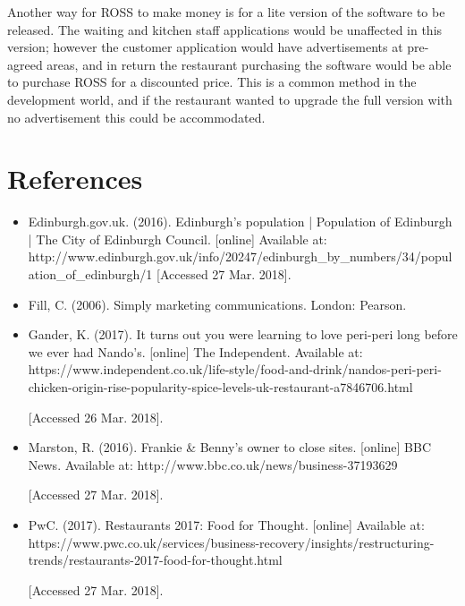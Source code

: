 \documentclass[11pt, oneside, a4paper]{report}   %
\begin{document}
\begin{flushleft}
Another way for ROSS to make money is for a lite version of the software to be released. The waiting and kitchen staff applications would be unaffected in this version; however the customer application would have advertisements at pre-agreed areas, and in return the restaurant purchasing the software would be able to purchase ROSS for a discounted price. This is a common method in the development world, and if the restaurant wanted to upgrade the full version with no advertisement this could be accommodated.

\newpage
\section{References}
\begin{itemize}
	\item Edinburgh.gov.uk. (2016). Edinburgh's population | Population of Edinburgh | The City of Edinburgh Council. [online] 
	Available at: 
	\linebreak 
	http://www.edinburgh.gov.uk/info/20247/edinburgh\_by\_numbers/34/population\_of\_edinburgh/1
	[Accessed 27 Mar. 2018].
	\item Fill, C. (2006). Simply marketing communications. London: Pearson.
	\item  Gander, K. (2017). It turns out you were learning to love peri-peri long before we ever had Nando's. [online] The Independent. 
	\linebreak
	Available at: https://www.independent.co.uk/life-style/food-and-drink/nandos-peri-peri-chicken-origin-rise-popularity-spice-levels-uk-restaurant-a7846706.html 
	
	[Accessed 26 Mar. 2018].
	\item Marston, R. (2016). Frankie \& Benny's owner to close sites. [online] BBC News. 
	\linebreak
	Available at: http://www.bbc.co.uk/news/business-37193629 
	
	[Accessed 27 Mar. 2018].
	\item PwC. (2017). Restaurants 2017: Food for Thought. [online] 
	\linebreak
	Available at: https://www.pwc.co.uk/services/business-recovery/insights/restructuring-trends/restaurants-2017-food-for-thought.html 
	
	[Accessed 27 Mar. 2018].
\end{itemize}
\end{flushleft}
\end{document}
